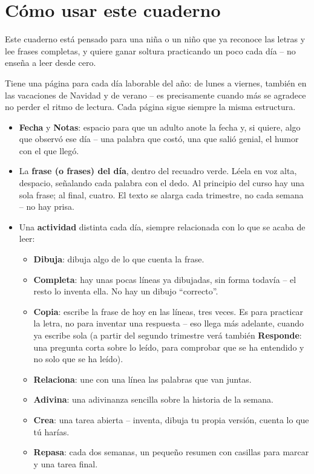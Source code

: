 \section*{Cómo usar este cuaderno}

Este cuaderno está pensado para una niña o un niño que ya reconoce las
letras y lee frases completas, y quiere ganar soltura practicando un
poco cada día -- no enseña a leer desde cero.

Tiene una página para cada día laborable del año: de lunes a viernes,
también en las vacaciones de Navidad y de verano -- es precisamente
cuando más se agradece no perder el ritmo de lectura. Cada página sigue
siempre la misma estructura.

\begin{itemize}[leftmargin=6mm]
\item \textbf{Fecha} y \textbf{Notas}: espacio para que un adulto anote
  la fecha y, si quiere, algo que observó ese día -- una palabra que
  costó, una que salió genial, el humor con el que llegó.
\item La \textbf{frase (o frases) del día}, dentro del recuadro verde.
  Léela en voz alta, despacio, señalando cada palabra con el dedo. Al
  principio del curso hay una sola frase; al final, cuatro. El texto se
  alarga cada trimestre, no cada semana -- no hay prisa.
\item Una \textbf{actividad} distinta cada día, siempre relacionada con
  lo que se acaba de leer:
  \begin{itemize}[leftmargin=6mm]
  \item \textbf{Dibuja}: dibuja algo de lo que cuenta la frase.
  \item \textbf{Completa}: hay unas pocas líneas ya dibujadas, sin forma
    todavía -- el resto lo inventa ella. No hay un dibujo ``correcto''.
  \item \textbf{Copia}: escribe la frase de hoy en las líneas, tres
    veces. Es para practicar la letra, no para inventar una respuesta --
    eso llega más adelante, cuando ya escribe sola (a partir del segundo
    trimestre verá también \textbf{Responde}: una pregunta corta sobre lo
    leído, para comprobar que se ha entendido y no solo que se ha leído).
  \item \textbf{Relaciona}: une con una línea las palabras que van
    juntas.
  \item \textbf{Adivina}: una adivinanza sencilla sobre la historia de
    la semana.
  \item \textbf{Crea}: una tarea abierta -- inventa, dibuja tu propia
    versión, cuenta lo que tú harías.
  \item \textbf{Repasa}: cada dos semanas, un pequeño resumen con
    casillas para marcar y una tarea final.
  \end{itemize}
\end{itemize}

